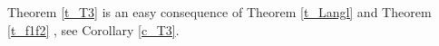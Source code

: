 \documentclass[14pt]{extarticle}
\newcommand{\Ct}{\mathbb{C}^\times}
\newcommand{\bA}{\mathsf{A}}
\newcommand{\bG}{\mathsf{G}}
\newcommand{\bB}{\mathsf{B}}
\newcommand{\cT}{\mathscr{T}}
\newcommand{\comp}{\textup{cmp}}
\DeclareMathOperator{\supp}{supp}
\DeclareMathOperator{\diag}{diag}
\newcommand{\Eis}{\textup{Eis}}
\theoremstyle{definition}
\begin{document}
Theorem \ref{t_T3}  is an easy consequence of Theorem
\ref{t_Langl} and Theorem \ref{t_f1f2} , see Corollary \ref{c_T3}. 














\end{document}
